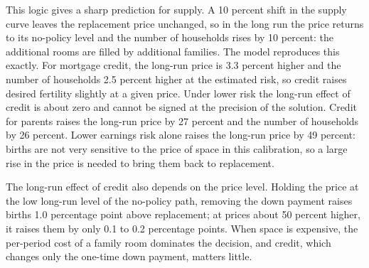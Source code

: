 This logic gives a sharp prediction for supply. A 10 percent shift in the
supply curve leaves the replacement price unchanged, so in the long run the
price returns to its no-policy level and the number of households rises by 10
percent: the additional rooms are filled by additional families. The model
reproduces this exactly. For mortgage credit, the long-run price is 3.3
percent higher and the number of households 2.5 percent higher at the
estimated risk, so credit raises desired fertility slightly at a given price.
Under lower risk the long-run effect of credit is about zero and cannot be
signed at the precision of the solution. Credit for parents raises the
long-run price by 27 percent and the number of households by 26 percent.
Lower earnings risk alone raises the long-run price by 49 percent: births are
not very sensitive to the price of space in this calibration, so a large rise
in the price is needed to bring them back to replacement.

The long-run effect of credit also depends on the price level. Holding the
price at the low long-run level of the no-policy path, removing the down
payment raises births 1.0 percentage point above replacement; at prices about
50 percent higher, it raises them by only 0.1 to 0.2 percentage points. When space is expensive,
the per-period cost of a family room dominates the decision, and credit, which
changes only the one-time down payment, matters little.
